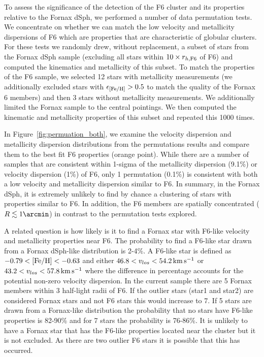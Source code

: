 \documentclass[twocolumn]{aastex63}
\newcommand{\stamp}[0]{F6\xspace}
\begin{document}
To assess the significance of the detection of the F6 cluster and its properties relative to the Fornax dSph, we performed a number of data permutation tests.
We concentrate on whether we can match the low velocity and metallicity dispersions of F6 which are properties that are characteristic of globular clusters. 
For these tests we randomly drew, without replacement, a subset of stars from the Fornax dSph sample (excluding all stars within $10\times r_{h, {\rm F6}}$ of \stamp) and computed the kinematics and metallicity of this subset.
To match the properties of the F6 sample, we selected 12 stars with metallicity measurements (we additionally excluded stars with $\epsilon_{\rm [Fe/H]}>0.5$ to match the quality of the Fornax 6 members) and then 3 stars without metallicity measurements.
We additionally limited the Fornax sample to the central pointings.
We then computed the kinematic and metallicity properties of this subset and repeated this 1000 times.



In Figure~\ref{fig:permuation_both}, we examine the velocity dispersion and  metallicity dispersion  distributions from the  permutations results and compare them to the best fit F6 properties (orange point).
While there are a number of samples that are consistent within 1-sigma of the metallicity dispersion (9.1\%) or velocity dispersion (1\%) of F6, only 1 permutation (0.1\%) is consistent with both a low velocity and metallicity dispersion similar to F6. 
In summary, in the Fornax dSph, it is extremely unlikely to find by chance a clustering of stars with properties similar to F6. 
In addition, the F6 members are spatially concentrated ($R \lesssim 1\arcmin$) in contrast to the permutation tests explored.

A related question is how likely is it to find a Fornax star with F6-like velocity and metallicity properties near F6. 
The probability to find a F6-like star  drawn from a Fornax dSph-like distribution is 2-4\%.  A F6-like star is defined as $-0.79<{\rm [Fe/H]}<-0.63$ and either $46.8<v_{los}< 54.2 \mathrm{\,km} \mathrm{\,s}^{-1}$ or $43.2<v_{los}< 57.8 \mathrm{\,km} \mathrm{\,s}^{-1}$  where the difference in percentage  accounts for the potential non-zero velocity dispersion.
In the current sample there are 5 Fornax members within 3 half-light radii of F6.  If the outlier stars (star1 and star2) are considered Fornax stars and not F6 stars this would increase to 7.
If 5 stars are drawn from a Fornax-like distribution the probability that no stars have F6-like properties is 82-90\% and  for 7 stars the probability is  76-86\%. 
It is unlikely to have a Fornax star that has the F6-like properties located near the cluster but it is not excluded.  As there are two outlier F6 stars it is possible that this has occurred. 
\end{document}
